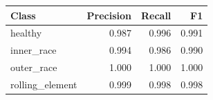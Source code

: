 \begin{tabular}{lrrr}
\hline
Class & Precision & Recall & F1 \\
\hline
healthy & 0.987 & 0.996 & 0.991 \\
inner\_race & 0.994 & 0.986 & 0.990 \\
outer\_race & 1.000 & 1.000 & 1.000 \\
rolling\_element & 0.999 & 0.998 & 0.998 \\
\hline
\end{tabular}
